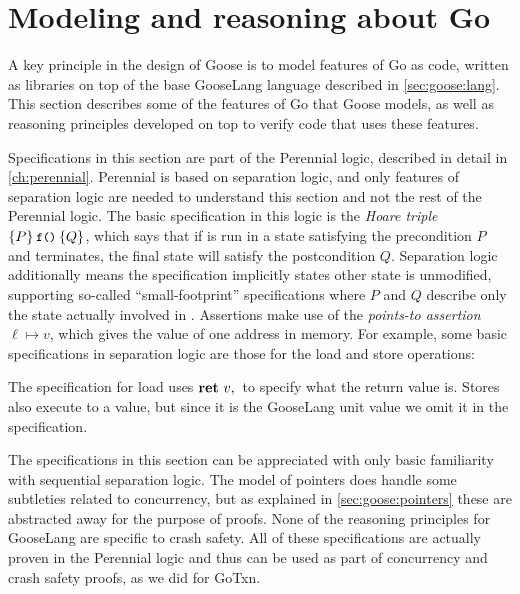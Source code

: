 \section{Modeling and reasoning about Go}%
\label{sec:goose:reasoning}

A key principle in the design of Goose is to model features of Go as code,
written as libraries on top of the base GooseLang language described in
\cref{sec:goose:lang}. This section describes some of the features of Go that
Goose models, as well as reasoning principles developed on top to verify code
that uses these features.

Specifications in this section are part of the Perennial logic, described in
detail in \cref{ch:perennial}. Perennial is based on separation logic, and only
features of separation logic are needed to understand this section and not the
rest of the Perennial logic. The basic
specification in this logic is the \emph{Hoare triple}
$\hoare{P}{\cc{f()}}{Q}$, which says that if  is run in a state
satisfying the precondition $P$ and terminates, the final state will satisfy the
postcondition $Q$. Separation logic additionally means the specification
implicitly states other state is unmodified, supporting so-called
``small-footprint'' specifications where $P$ and $Q$
describe only the state actually involved in .
Assertions make use of the \emph{points-to assertion} $\ell \mapsto v$, which
gives the value of one address in memory. For example, some basic specifications
in separation logic are those for the load and store operations:
%
\begin{mathpar}

\end{mathpar}
The specification for load uses $\Ret{v}$ to specify what the return value is.
Stores also execute to a value, but since it is the GooseLang unit value we omit
it in the specification.

The specifications in this section can be appreciated with only basic
familiarity with sequential separation logic. The model of pointers does handle
some subtleties related to concurrency, but as explained in
\cref{sec:goose:pointers} these are abstracted away for the purpose of proofs.
None of the reasoning principles for GooseLang are specific to crash safety. All of these
specifications are actually proven in the Perennial logic and thus can be used
as part of concurrency and crash safety proofs, as we did for GoTxn.

